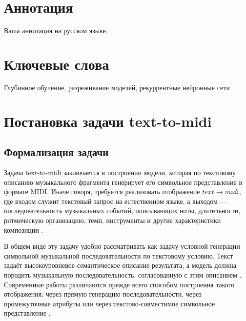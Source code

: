 \documentclass[a4paper,12pt]{extarticle}
\begin{document}
\newpage
\setcounter{page}{2}

{
	\hypersetup{linkcolor=black}
	\tableofcontents
}

\newpage

\newpage
\section*{Аннотация}   %
Ваша аннотация на русском языке.


\section*{Ключевые слова}
Глубинное обучение, разреживание моделей, рекуррентные нейронные сети
\pagebreak
\newpage 

\section{Постановка задачи text-to-midi}

\subsection{Формализация задачи}

Задача text-to-midi заключается в построении модели, которая по
текстовому описанию музыкального фрагмента генерирует его символьное
представление в формате MIDI. Иначе говоря, требуется реализовать
отображение $text \rightarrow midi$, где входом служит текстовый запрос
на естественном языке, а выходом --- последовательность музыкальных
событий, описывающих ноты, длительности, ритмическую организацию, темп,
инструменты и другие характеристики композиции
\cite{wu2022texttomusic,lu2023musecoco,melechovsky2024midicaps,bhandari2025text2midi}.

В общем виде эту задачу удобно рассматривать как задачу условной
генерации символьной музыкальной последовательности по текстовому
условию. Текст задаёт высокоуровневое семантическое описание результата,
а модель должна породить музыкальную последовательность, согласованную с
этим описанием \cite{wu2022texttomusic,lu2023musecoco}. Современные
работы различаются прежде всего способом построения такого отображения:
через прямую генерацию последовательности, через промежуточные атрибуты
или через текстово-совместимое символьное представление
\cite{lu2023musecoco,yuan2024chatmusician,bhandari2025text2midi}.
\end{document}
